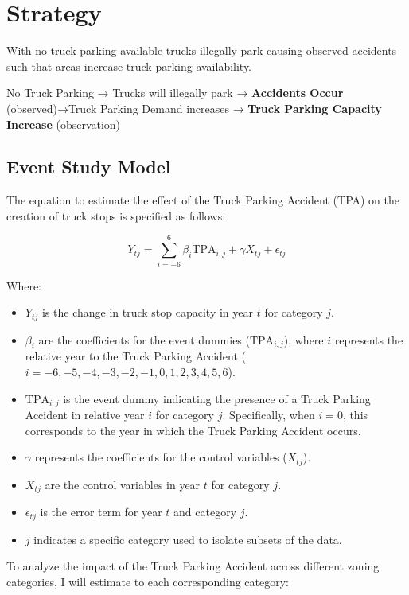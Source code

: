\documentclass[
  12pt]{article}
\providecommand{\tightlist}{%
  \setlength{\itemsep}{0pt}\setlength{\parskip}{0pt}}\usepackage{longtable,booktabs,array}
\begin{document}
\section{\texorpdfstring{\textbf{Strategy}}{Strategy}}\label{strategy}

With no truck parking available trucks illegally park causing observed
accidents such that areas increase truck parking availability.

No Truck Parking → Trucks will illegally park → \textbf{Accidents Occur}
(observed)→Truck Parking Demand increases → \textbf{Truck Parking
Capacity Increase} (observation)

\subsection{Event Study Model}\label{event-study-model}

The equation to estimate the effect of the Truck Parking Accident (TPA)
on the creation of truck stops is specified as follows:

\[
Y_{tj} = \sum_{i=-6}^{6} \beta_i \text{TPA}_{i,j} + \gamma X_{tj} + \epsilon_{tj}
\]

Where:

\begin{itemize}
\tightlist
\item
  \(Y_{tj}\) is the change in truck stop capacity in year \(t\) for
  category \(j\).
\item
  \(\beta_i\) are the coefficients for the event dummies
  (\(\text{TPA}_{i,j}\)), where \(i\) represents the relative year to
  the Truck Parking Accident
  (\(i = -6, -5, -4, -3, -2, -1, 0, 1, 2, 3, 4, 5, 6\)).
\item
  \(\text{TPA}_{i,j}\) is the event dummy indicating the presence of a
  Truck Parking Accident in relative year \(i\) for category \(j\).
  Specifically, when \(i = 0\), this corresponds to the year in which
  the Truck Parking Accident occurs.
\item
  \(\gamma\) represents the coefficients for the control variables
  (\(X_{tj}\)).
\item
  \(X_{tj}\) are the control variables in year \(t\) for category \(j\).
\item
  \(\epsilon_{tj}\) is the error term for year \(t\) and category \(j\).
\item
  \(j\) indicates a specific category used to isolate subsets of the
  data.
\end{itemize}

To analyze the impact of the Truck Parking Accident across different
zoning categories, I will estimate to each corresponding category:
\end{document}
